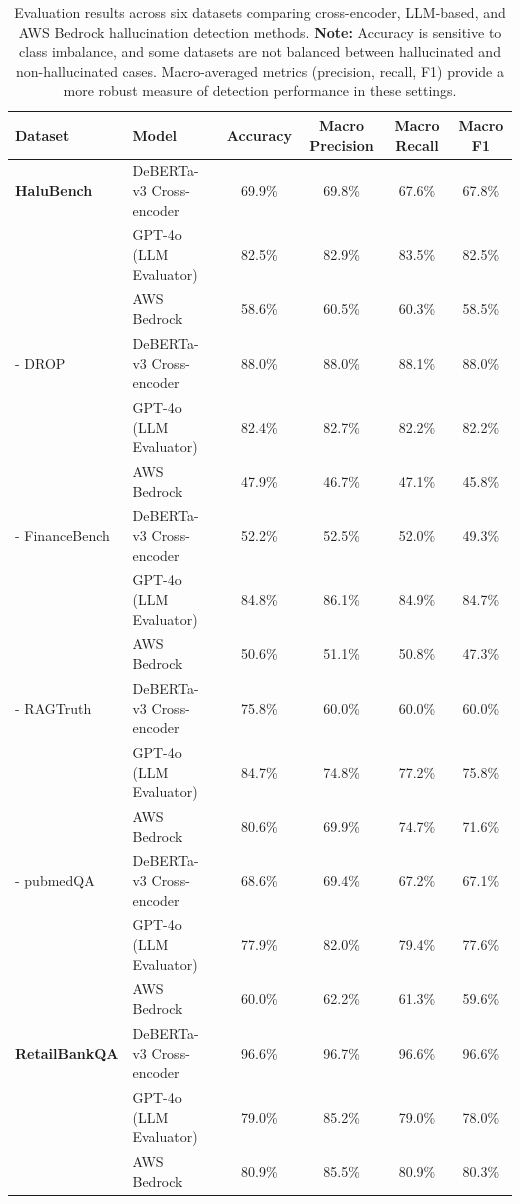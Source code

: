 \documentclass[11pt]{article}
\begin{document}
\begin{table}[ht] 
\centering
\footnotesize
\begin{tabular}{@{}llcccc@{}}
\toprule
\textbf{Dataset} & \textbf{Model} & \textbf{Accuracy} & \textbf{Macro Precision} & \textbf{Macro Recall} & \textbf{Macro F1} \\
\midrule
\textbf{HaluBench} & DeBERTa-v3 Cross-encoder & 69.9\% & 69.8\% & 67.6\% & 67.8\% \\
          & GPT-4o (LLM Evaluator)      & 82.5\% & 82.9\% & 83.5\% & 82.5\% \\
          & AWS Bedrock       & 58.6\% & 60.5\% & 60.3\% & 58.5\% \\
\midrule
- DROP & DeBERTa-v3 Cross-encoder & 88.0\% & 88.0\% & 88.1\% & 88.0\% \\
     & GPT-4o (LLM Evaluator)          & 82.4\% & 82.7\% & 82.2\% & 82.2\% \\
     & AWS Bedrock       & 47.9\% & 46.7\% & 47.1\% & 45.8\% \\
\midrule
- FinanceBench & DeBERTa-v3 Cross-encoder & 52.2\% & 52.5\% & 52.0\% & 49.3\% \\
             & GPT-4o (LLM Evaluator) & 84.8\% & 86.1\% & 84.9\% & 84.7\% \\
             & AWS Bedrock  & 50.6\% & 51.1\% & 50.8\% & 47.3\% \\
\midrule
- RAGTruth & DeBERTa-v3 Cross-encoder & 75.8\% & 60.0\% & 60.0\% & 60.0\% \\
         & GPT-4o (LLM Evaluator)    & 84.7\% & 74.8\% & 77.2\% & 75.8\% \\
         & AWS Bedrock       & 80.6\% & 69.9\% & 74.7\% & 71.6\% \\
\midrule
- pubmedQA & DeBERTa-v3 Cross-encoder & 68.6\% & 69.4\% & 67.2\% & 67.1\% \\
         & GPT-4o (LLM Evaluator) & 77.9\% & 82.0\% & 79.4\% & 77.6\% \\
         & AWS Bedrock       & 60.0\% & 62.2\% & 61.3\% & 59.6\% \\
\midrule
\textbf{RetailBankQA} & DeBERTa-v3  Cross-encoder & 96.6\% & 96.7\% & 96.6\% & 96.6\% \\
             & GPT-4o (LLM Evaluator)           & 79.0\% & 85.2\% & 79.0\% & 78.0\% \\
             & AWS Bedrock       & 80.9\% & 85.5\% & 80.9\% & 80.3\% \\
\bottomrule
\end{tabular}
\caption{Evaluation results across six datasets comparing cross-encoder, LLM-based, and AWS Bedrock hallucination detection methods. 
\textbf{Note:} Accuracy is sensitive to class imbalance, and some datasets are not balanced between hallucinated and non-hallucinated cases. Macro-averaged metrics (precision, recall, F1) provide a more robust measure of detection performance in these settings.
}
\label{tab:results_full}
\end{table}
\end{document}

